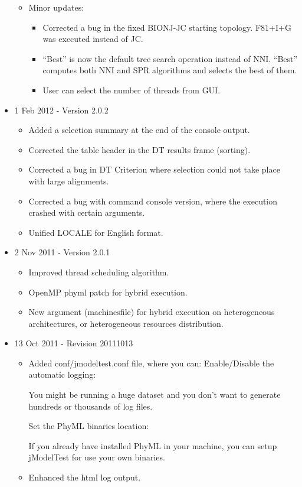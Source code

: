 \begin{itemize}
\begin{itemize}
\begin{itemize}
		\end{itemize}
		\item Minor updates:
		\begin{itemize}
			\item Corrected a bug in the fixed BIONJ-JC starting topology. F81+I+G was executed instead of JC.
			\item ``Best'' is now the default tree search operation instead of NNI. ``Best'' computes both NNI and SPR algorithms and selects the best of them.
			\item User can select the number of threads from GUI. 
		\end{itemize}
	\end{itemize}


	\item 1 Feb 2012 - Version 2.0.2

	\begin{itemize}
		\item Added a selection summary at the end of the console output.
		\item Corrected the table header in the DT results frame (sorting).
		\item Corrected a bug in DT Criterion where selection could not take place with large alignments.
		\item Corrected a bug with command console version, where the execution crashed with certain arguments.
		\item Unified LOCALE for English format. 
	\end{itemize}

	\item 2 Nov 2011 - Version 2.0.1

	\begin{itemize}
		\item Improved thread scheduling algorithm.
		\item OpenMP phyml patch for hybrid execution.
		\item New argument (machinesfile) for hybrid execution on heterogeneous architectures, or heterogeneous resources distribution. 
	\end{itemize}

	\item 13 Oct 2011 - Revision 20111013

	\begin{itemize}
		\item Added conf/jmodeltest.conf file, where you can:
			Enable/Disable the automatic logging:

			    You might be running a huge dataset and you don't want to generate hundreds or thousands of log files. 

			Set the PhyML binaries location:

			    If you already have installed PhyML in your machine, you can setup jModelTest for use your own binaries. 

		\item Enhanced the html log output. 
	\end{itemize}

\end{itemize}

